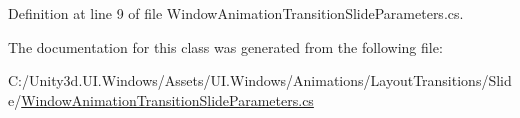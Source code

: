 Definition at line 9 of file Window\+Animation\+Transition\+Slide\+Parameters.\+cs.



The documentation for this class was generated from the following file\+:\begin{DoxyCompactItemize}
\item 
C\+:/\+Unity3d.\+U\+I.\+Windows/\+Assets/\+U\+I.\+Windows/\+Animations/\+Layout\+Transitions/\+Slide/\hyperlink{_window_animation_transition_slide_parameters_8cs}{Window\+Animation\+Transition\+Slide\+Parameters.\+cs}\end{DoxyCompactItemize}
